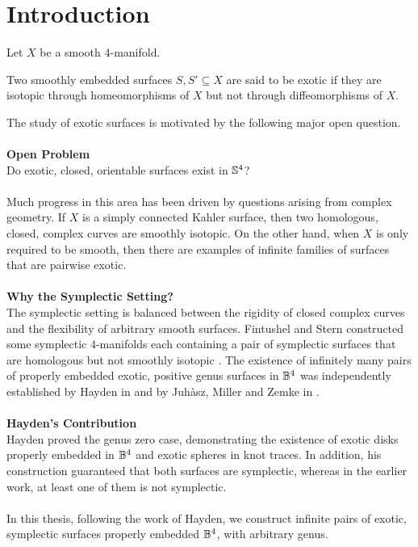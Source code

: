 \documentclass[12pt,a4paper,oneside]{book}
\begin{document}
\chapter*{Introduction}
Let $X$ be a smooth $4$-manifold. 
\begin{defn} Two smoothly embedded surfaces $S, S' \subseteq X$ are said to be exotic if they are isotopic through homeomorphisms of $X$ but not through diffeomorphisms of $X$. 
\end{defn}
The study of exotic surfaces is motivated by the following major open question.\\
\\
\textbf{Open Problem} \\
Do exotic, closed, orientable surfaces exist in $\mathbb{S}^4$? \\ \\
Much progress in this area has been driven by questions arising from complex geometry. If $X$ is a simply connected Kahler surface, then two homologous, closed, complex curves are smoothly isotopic. On the other hand, when $X$ is only required to be smooth, then there are examples of infinite families of surfaces that are pairwise exotic. \\ \\
\textbf{Why the Symplectic Setting?} \\
The symplectic setting is balanced between the rigidity of closed complex curves and the flexibility of arbitrary smooth surfaces. Fintushel and Stern constructed some symplectic $4$-manifolds each containing a pair of symplectic surfaces that are homologous but not smoothly isotopic \cite{fintushel1999symplectic}.
The existence of infinitely many pairs of properly embedded exotic, positive genus surfaces in $\mathbb{B}^4$ was independently established by Hayden in \cite{hayden2021exoticallyknotteddiskscomplex} and by Juhàsz, Miller and Zemke in \cite{Juh_sz_2021}. \\ \\
\textbf{Hayden's Contribution} \\
Hayden proved the genus zero case, demonstrating the existence of exotic disks properly embedded in $\mathbb{B}^4$ and exotic spheres in knot traces. In addition, his construction guaranteed that both surfaces are symplectic, whereas in the earlier work, at least one of them is not symplectic.
\\ \\
In this thesis, following the work of Hayden, we construct infinite pairs of exotic, symplectic surfaces properly embedded $\mathbb{B}^4$, with arbitrary genus. \\
\end{document}
